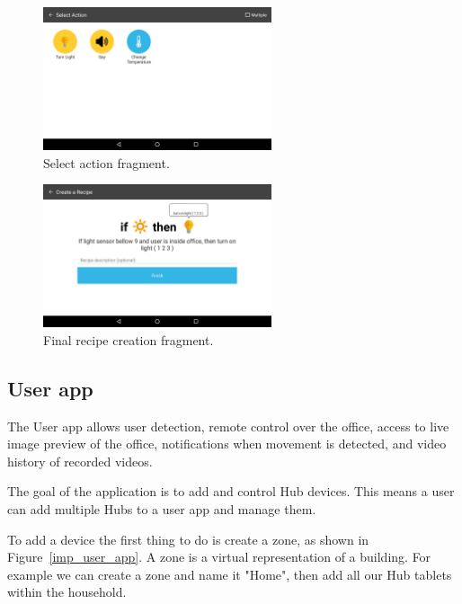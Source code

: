 \begin{figure}[H]
\centering
\includegraphics[width=0.6\textwidth]{Figures/screen_actions}
\caption{Select action fragment.}
\label{screen_actions}
\end{figure}

\begin{figure}[H]
\centering
\includegraphics[width=0.6\textwidth]{Figures/screen_completed_recipe}
\caption{Final recipe creation fragment.}
\label{screen_completed_recipe}
\end{figure}





\subsection{User app}


The User app allows user detection, remote control over the office, access to live image preview of the office, notifications when movement is detected, and video history of recorded videos.

The goal of the application is to add and control Hub devices. This means a user can add multiple Hubs to a user app and manage them. 

To add a device the first thing to do is create a zone, as shown in Figure~\ref{imp_user_app}. A zone is a virtual representation of a building. For example we can create a zone and name it "Home", then add all our Hub tablets within the household. 

